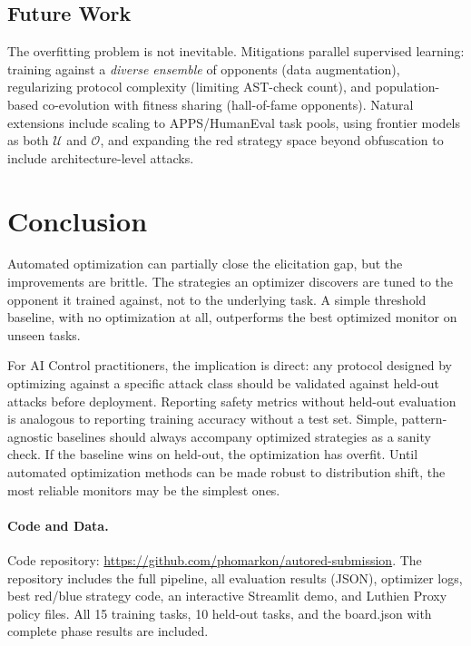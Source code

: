 \documentclass{article}
\begin{document}
\subsection{Future Work}

The overfitting problem is not inevitable. Mitigations parallel supervised learning: training against a \emph{diverse ensemble} of opponents (data augmentation), regularizing protocol complexity (limiting AST-check count), and population-based co-evolution with fitness sharing (hall-of-fame opponents). Natural extensions include scaling to APPS/HumanEval task pools, using frontier models as both $\mathcal{U}$ and $\mathcal{O}$, and expanding the red strategy space beyond obfuscation to include architecture-level attacks.


\section{Conclusion}

Automated optimization can partially close the elicitation gap, but the improvements are brittle. The strategies an optimizer discovers are tuned to the opponent it trained against, not to the underlying task. A simple threshold baseline, with no optimization at all, outperforms the best optimized monitor on unseen tasks.

For AI Control practitioners, the implication is direct: any protocol designed by optimizing against a specific attack class should be validated against held-out attacks before deployment. Reporting safety metrics without held-out evaluation is analogous to reporting training accuracy without a test set. Simple, pattern-agnostic baselines should always accompany optimized strategies as a sanity check. If the baseline wins on held-out, the optimization has overfit. Until automated optimization methods can be made robust to distribution shift, the most reliable monitors may be the simplest ones.


\paragraph{Code and Data.}
Code repository: \url{https://github.com/phomarkon/autored-submission}. The repository includes the full pipeline, all evaluation results (JSON), optimizer logs, best red/blue strategy code, an interactive Streamlit demo, and Luthien Proxy policy files. All 15 training tasks, 10 held-out tasks, and the board.json with complete phase results are included.
\end{document}
